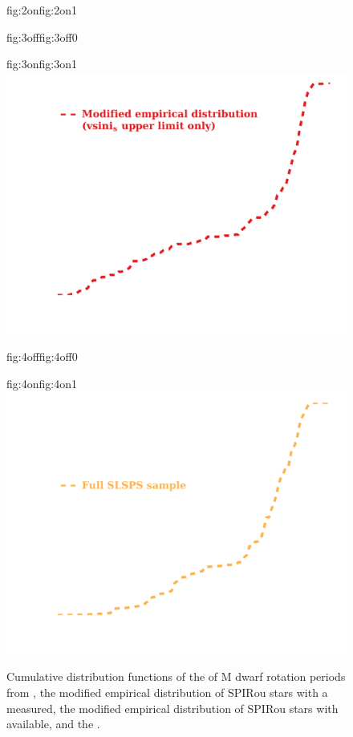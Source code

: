 \begin{figure}
\begin{ocg}{fig:2on}{fig:2on}{1}
  \end{ocg}
  \hspace{-0.8\hsize}%
  \begin{ocg}{fig:3off}{fig:3off}{0}%
  \end{ocg}%
  \begin{ocg}{fig:3on}{fig:3on}{1}%
    \includegraphics[width=0.8\hsize]{figures/ProtCDF_3.png}%
  \end{ocg}
  \hspace{-0.8\hsize}%
  \begin{ocg}{fig:4off}{fig:4off}{0}%
  \end{ocg}%
  \begin{ocg}{fig:4on}{fig:4on}{1}%
    \includegraphics[width=0.8\hsize]{figures/ProtCDF_4.png}%
  \end{ocg}
  \hspace{-0.8\hsize}%
  \caption[M dwarf rotation period distributions.]
      {\small Cumulative distribution functions of the 
     of M dwarf rotation periods
    from \cite{newton16a}, the modified empirical distribution of SPIRou stars with a 
     measured, the
    modified empirical distribution of SPIRou stars with
     available, and the
    .}
  \label{BSfig:protcdf}
\end{figure}

